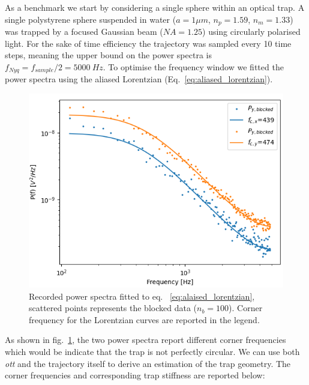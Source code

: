 As a benchmark we start by considering a single sphere within 
an optical trap. A single polystyrene sphere suspended in water 
($a=1\mu m$, $n_p=1.59$, $n_m=1.33$) was trapped by a focused 
Gaussian beam ($NA=1.25$) using circularly polarised light. For 
the sake of time efficiency the trajectory was sampled every 10
time steps, meaning the upper bound on the power spectra is
$f_{Nyq}=f_{sample}/2=5000\ Hz$. To optimise the frequency window
we fitted the power spectra using the aliased Lorentzian 
(Eq.~\eqref{eq:aliased_lorentzian}).
\begin{figure}[h!]
	\centering
	\includegraphics[width=\linewidth]{PSD_sphere.png}
	\caption{Recorded power spectra fitted to eq.~
		\ref{eq:alaised_lorentzian}, scattered points represents 
		the blocked data ($n_b=100$). Corner frequency for the 
		Lorentzian curves are reported in the legend.}
	\label{fig:psd_sphere}
\end{figure} 

As shown in fig.~\ref{fig:psd_sphere}, the two power spectra 
report different corner frequencies which would be indicate 
that the trap is not perfectly circular. We can use both 
\textit{ott} and the trajectory itself to derive an estimation 
of the trap geometry. The corner frequencies and corresponding 
trap stiffness are reported below:

